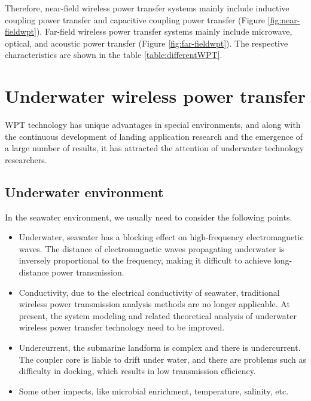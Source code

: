 Therefore, near-field wireless power transfer systems mainly include inductive coupling power transfer and capacitive coupling power transfer (Figure \ref{fig:near-fieldwpt}). Far-field wireless power transfer systems mainly include microwave, optical, and acoustic power transfer (Figure \ref{fig:far-fieldwpt}).  The respective characteristics are shown in the table \ref{table:differentWPT}.


\section{Underwater wireless power transfer}
WPT technology has unique advantages in special environments, and along with the continuous development of landing application research and the emergence of a large number of results, it has attracted the attention of underwater technology researchers. 
\subsection{Underwater environment}
In the seawater environment, we usually need to consider the following points.

\begin{itemize}
    \item Underwater, seawater has a blocking effect on high-frequency electromagnetic waves. The distance of electromagnetic waves propagating underwater is inversely proportional to the frequency, making it difficult to achieve long-distance power transmission.
    \item Conductivity, due to the electrical conductivity of seawater, traditional wireless power transmission analysis methods are no longer applicable. At present, the system modeling and related theoretical analysis of underwater wireless power transfer technology need to be improved.
    \item Undercurrent, the submarine landform is complex and there is undercurrent. The coupler core is liable to drift under water, and there are problems such as difficulty in docking, which results in low transmission efficiency.
    \item Some other impects, like microbial enrichment, temperature, salinity, etc.
    
\end{itemize}


